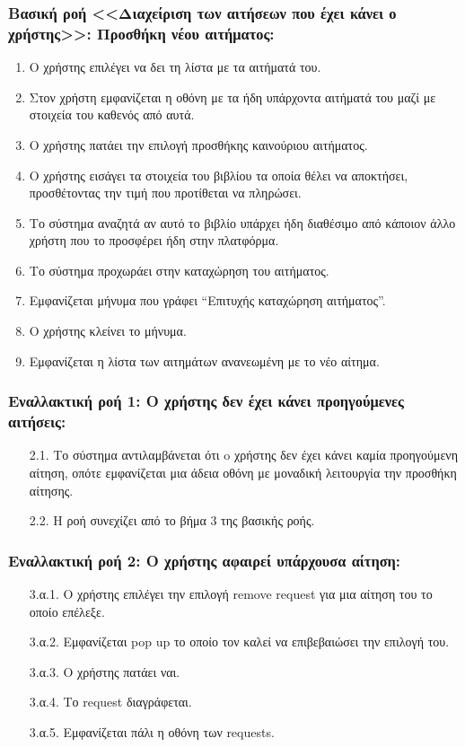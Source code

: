 \documentclass[12pt,a4paper]{article}
\begin{document}
\subsubsection*{Βασική ροή <<Διαχείριση των αιτήσεων που έχει κάνει ο χρήστης>>: Προσθήκη νέου αιτήματος:}
\begin{enumerate}
    \item Ο χρήστης επιλέγει να δει τη λίστα με τα αιτήματά του.
    \item Στον χρήστη εμφανίζεται η οθόνη με τα ήδη υπάρχοντα αιτήματά του μαζί με στοιχεία του καθενός από αυτά.
    \item Ο χρήστης πατάει την επιλογή προσθήκης καινούριου αιτήματος.
    \item Ο χρήστης εισάγει τα στοιχεία του βιβλίου τα οποία θέλει να αποκτήσει, προσθέτοντας την τιμή που προτίθεται να πληρώσει.
    \item Το σύστημα αναζητά αν αυτό το βιβλίο υπάρχει ήδη διαθέσιμο από κάποιον άλλο χρήστη που το προσφέρει ήδη στην πλατφόρμα.
    \item Το σύστημα προχωράει στην καταχώρηση του αιτήματος.
    \item Εμφανίζεται μήνυμα που γράφει “Επιτυχής καταχώρηση αιτήματος”.
    \item Ο χρήστης κλείνει το μήνυμα.
    \item Εμφανίζεται η λίστα των αιτημάτων ανανεωμένη με το νέο αίτημα.
\end{enumerate}

\subsubsection*{Εναλλακτική ροή 1: Ο χρήστης δεν έχει κάνει προηγούμενες αιτήσεις:}
\begin{enumerate}
    \item [2.1.] Το σύστημα αντιλαμβάνεται ότι o χρήστης δεν έχει κάνει καμία προηγούμενη αίτηση, οπότε εμφανίζεται μια άδεια οθόνη με μοναδική λειτουργία την προσθήκη αίτησης.
    \item [2.2.] Η ροή συνεχίζει από το βήμα 3 της βασικής ροής.
\end{enumerate}

\subsubsection*{Εναλλακτική ροή 2: Ο χρήστης αφαιρεί υπάρχουσα αίτηση:}
\begin{enumerate}
    \item [3.α.1.] Ο χρήστης επιλέγει την επιλογή remove request για μια αίτηση του το οποίο επέλεξε.
    \item [3.α.2.] Εμφανίζεται pop up το οποίο τον καλεί να επιβεβαιώσει την επιλογή του.
    \item [3.α.3.] Ο χρήστης πατάει ναι.
    \item [3.α.4.] Το request διαγράφεται.
    \item [3.α.5.] Εμφανίζεται πάλι η οθόνη των requests.
\end{enumerate}
\end{document}
